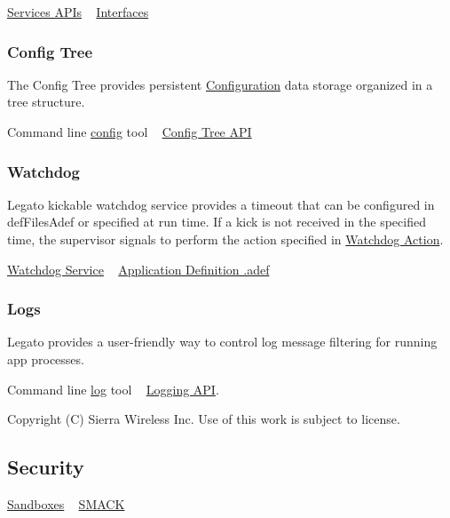 \hyperlink{legatoServices}{Services A\+P\+Is} ~\newline
 \hyperlink{basicInterfaces}{Interfaces}\hypertarget{basic_runtime_arch_basicRuntimeArch_configTree}{}\subsubsection{Config Tree}\label{basic_runtime_arch_basicRuntimeArch_configTree}
The Config Tree provides persistent \hyperlink{basicConfig}{Configuration} data storage organized in a tree structure.

Command line \hyperlink{toolsTarget_config}{config} tool ~\newline
 \hyperlink{c_config}{Config Tree A\+P\+I}\hypertarget{basic_runtime_arch_basicRuntimeArch_watchDog}{}\subsubsection{Watchdog}\label{basic_runtime_arch_basicRuntimeArch_watchDog}
Legato kickable watchdog service provides a timeout that can be configured in {\ttfamily def\+Files\+Adef} or specified at run time. If a kick is not received in the specified time, the supervisor signals to perform the action specified in \hyperlink{def_files_adef_defFilesAdef_processWatchdogAction}{Watchdog Action}.

\hyperlink{c_wdog}{Watchdog Service} ~\newline
 \hyperlink{defFilesAdef}{Application Definition .adef}\hypertarget{basic_runtime_arch_basicRuntimeArch_logs}{}\subsubsection{Logs}\label{basic_runtime_arch_basicRuntimeArch_logs}
Legato provides a user-\/friendly way to control log message filtering for running app processes.

Command line \hyperlink{toolsTarget_log}{log} tool ~\newline
 \hyperlink{c_logging}{Logging A\+P\+I}.





Copyright (C) Sierra Wireless Inc. Use of this work is subject to license. \hypertarget{basicSecurity}{}\subsection{Security}\label{basicSecurity}
\hyperlink{basicSecuritySandbox}{Sandboxes} ~\newline
 \hyperlink{basicSecuritySmack}{S\+M\+A\+C\+K}



